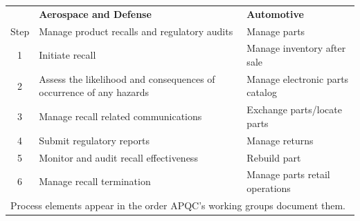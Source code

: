 \setlength{\tabcolsep}{6pt}
\footnotesize
\begin{tabular}{cll}
\toprule
 & \textbf{Aerospace and Defense} & \textbf{Automotive} \\
Step & Manage product recalls and regulatory audits & Manage parts \\
\midrule
1 & Initiate recall & Manage inventory after sale \\
2 & Assess the likelihood and consequences of occurrence of any hazards & Manage electronic parts catalog \\
3 & Manage recall related communications & Exchange parts/locate parts \\
4 & Submit regulatory reports & Manage returns \\
5 & Monitor and audit recall effectiveness & Rebuild part \\
6 & Manage recall termination & Manage parts retail operations \\
\bottomrule
\multicolumn{3}{l}{\footnotesize Process elements appear in the order APQC's working groups document them.}\\
\end{tabular}
